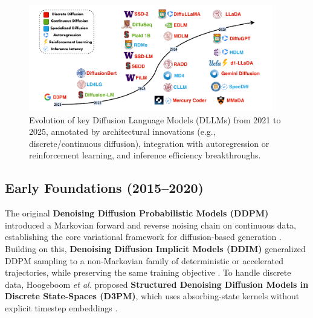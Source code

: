 \begin{figure}[t]
    \centering
    \includegraphics[width=0.95\textwidth]{figs/DLLMs_timeline.pdf}
    \caption{Evolution of key Diffusion Language Models (DLLMs) from 2021 to 2025, annotated by architectural innovations (e.g., discrete/continuous diffusion), integration with autoregression or reinforcement learning, and inference efficiency breakthroughs.}
    \label{fig:timeline}
\end{figure}

\subsection{Early Foundations (2015–2020)}
The original \textbf{Denoising Diffusion Probabilistic Models (DDPM)} introduced a Markovian forward and reverse noising chain on continuous data, establishing the core variational framework for diffusion-based generation \cite{ho_denoising_2020}. Building on this, \textbf{Denoising Diffusion Implicit Models (DDIM)} generalized DDPM sampling to a non-Markovian family of deterministic or accelerated trajectories, while preserving the same training objective \cite{song_denoising_2020}. To handle discrete data, Hoogeboom \emph{et al.} proposed \textbf{Structured Denoising Diffusion Models in Discrete State-Spaces (D3PM)}, which uses absorbing-state kernels without explicit timestep embeddings \cite{hoogeboom_structured_2021}.

